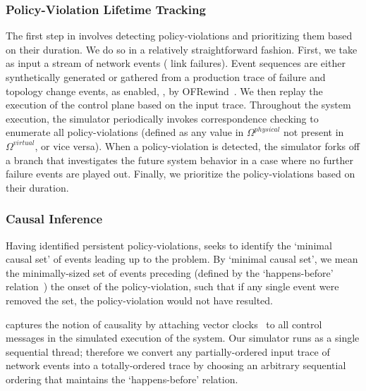 \subsubsection{Policy-Violation Lifetime Tracking} The first step in
\simulator{} involves detecting policy-violations and prioritizing them based
on their duration.
We do so in a relatively straightforward fashion. First, we take as input
a stream of network events (\eg{} link failures). Event sequences are either
synthetically generated or gathered from a production trace of failure and topology change
events, as enabled, \eg{}, by OFRewind~\cite{ofrewind}. We then replay the execution of the
control plane based on the input trace. Throughout the system execution,
the simulator periodically invokes correspondence checking to enumerate all
policy-violations (defined as any value in $\Omega^{physical}$ not present in
$\Omega^{virtual}$, or vice versa). When a policy-violation is detected,
the simulator forks off a branch that investigates the future system behavior
in a case where no further failure events are played out. Finally, we
prioritize the policy-violations based on their duration.

\subsubsection{\bf Causal Inference} Having identified persistent
policy-violations, \simulator{} seeks to identify the `minimal causal set' of
events leading up to the problem. By `minimal causal set', we mean
the minimally-sized set of events preceding (defined by the `happens-before'
relation~\cite{Lamport:1978:TCO:359545.359563}) the onset of the policy-violation, such that
if any single event were removed the set, the policy-violation would not have resulted.

\Simulator{} captures the notion of causality by attaching vector clocks~\cite{Mattern89virtualtime} to
all control messages in the simulated execution of the system. Our
simulator runs as a single sequential thread; therefore we convert any partially-ordered input trace
of network events into a totally-ordered trace by choosing an arbitrary
sequential ordering that maintains the `happens-before'
relation.


